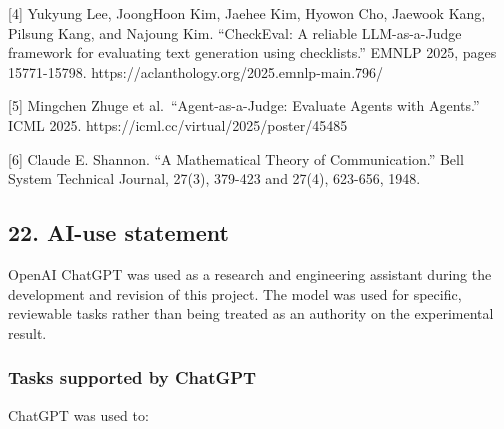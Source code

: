 \documentclass[
]{article}
\begin{document}
{[}4{]} Yukyung Lee, JoongHoon Kim, Jaehee Kim, Hyowon Cho, Jaewook
Kang, Pilsung Kang, and Najoung Kim. ``CheckEval: A reliable
LLM-as-a-Judge framework for evaluating text generation using
checklists.'' EMNLP 2025, pages 15771-15798.
https://aclanthology.org/2025.emnlp-main.796/

{[}5{]} Mingchen Zhuge et al.~``Agent-as-a-Judge: Evaluate Agents with
Agents.'' ICML 2025. https://icml.cc/virtual/2025/poster/45485

{[}6{]} Claude E. Shannon. ``A Mathematical Theory of Communication.''
Bell System Technical Journal, 27(3), 379-423 and 27(4), 623-656, 1948.

\subsection{22. AI-use statement}\label{ai-use-statement}

OpenAI ChatGPT was used as a research and engineering assistant during
the development and revision of this project. The model was used for
specific, reviewable tasks rather than being treated as an authority on
the experimental result.

\subsubsection{Tasks supported by
ChatGPT}\label{tasks-supported-by-chatgpt}

ChatGPT was used to:
\end{document}
